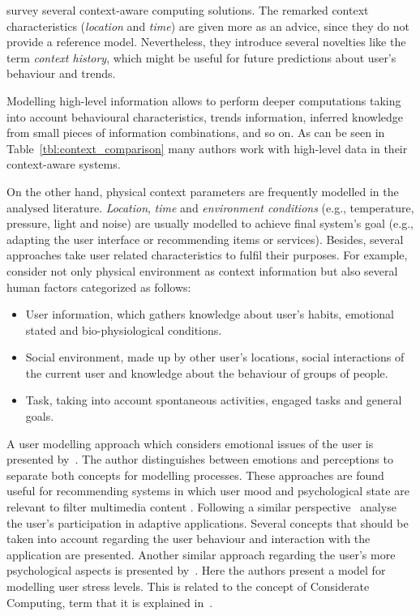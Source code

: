 \citet{chen_survey_2000} survey several context-aware computing solutions. The 
remarked context characteristics (\textit{location} and \textit{time}) are given 
more as an advice, since they do not provide a reference model. Nevertheless, 
they introduce several novelties like the term \textit{context history}, which 
might be useful for future predictions about user's behaviour and trends.

Modelling high-level information allows to perform deeper computations taking
into account behavioural characteristics, trends information, inferred knowledge
from small pieces of information combinations, and so on. As can be seen in
Table~\ref{tbl:context_comparison} many authors work with high-level data in 
their context-aware systems. 

On the other hand, physical context parameters are frequently modelled in the
analysed literature. \textit{Location}, \textit{time} and \textit{environment 
conditions} (e.g., temperature, pressure, light and noise) are usually modelled 
to achieve final system's goal (e.g., adapting the user interface or recommending 
items or services). Besides, several approaches take user related characteristics 
to fulfil their purposes. For example,~\citet{schmidt_there_1999} consider not 
only physical environment as context information but also several human factors 
categorized as follows:

\begin{itemize}
  \item User information, which gathers knowledge about user's habits, emotional
  stated and bio-physiological conditions.
  \item Social environment, made up by other user's locations, social interactions
  of the current user and knowledge about the behaviour of groups of people.
  \item Task, taking into account spontaneous activities, engaged tasks and 
  general goals.
\end{itemize}

A user modelling approach which considers emotional issues of the user is 
presented by~\citet{pereira_triple_2005}. The author distinguishes between 
emotions and perceptions to separate both concepts for modelling processes. 
These approaches are found useful for recommending systems in which user mood 
and psychological state are relevant to filter multimedia content 
\citep{baltrunas_incarmusic_2011}. Following a similar perspective~\citet{evers_achieving_2012}
analyse the user's participation in adaptive applications. Several concepts that
should be taken into account regarding the user behaviour and interaction with
the application are presented. Another similar approach regarding the user's more 
psychological aspects is presented by~\citet{liao_decision_2005}. Here the 
authors present a model for modelling user stress levels. This is related to the 
concept of Considerate Computing, term that it is explained in~\citep{gibbs_considerate_2005}.

